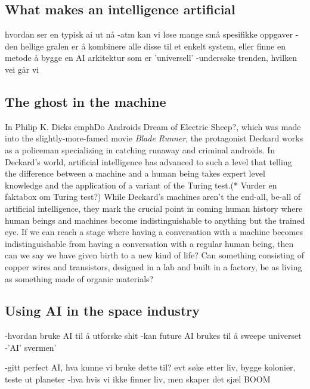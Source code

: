 \subsection{What makes an intelligence artificial}

hvordan ser en typisk ai ut nå
-atm kan vi løse mange små spesifikke oppgaver
-den hellige gralen er å kombinere alle disse til et enkelt system, eller finne en metode å bygge en AI arkitektur som er 'universell'
-undersøke trenden, hvilken vei går vi

\subsection{The ghost in the machine}

In Philip K. Dicks emph{Do Androids Dream of Electric Sheep?}, which was made into the slightly-more-famed movie \emph{Blade Runner}, the protagonist Deckard works as a policeman specializing in catching runaway and criminal androids. In Deckard's world, artificial intelligence has advanced to such a level that telling the difference between a machine and a human being takes expert level knowledge and the application of a variant of the Turing test.(* Vurder en faktabox om Turing test?) 
While Deckard's machines aren't the end-all, be-all of artificial intelligence, they mark the crucial point in coming human history where human beings and machines become indistinguishable to anything but the trained eye. If we can reach a stage where having a conversation with a machine becomes indistinguishable from having a conversation with a regular human being, then can we say we have given birth to a new kind of life? Can something consisting of copper wires and transistors, designed in a lab and built in a factory, be as living as something made of organic materials? 

\subsection{Using AI in the space industry}

-hvordan bruke AI til å utforske shit
-kan future AI brukes til å sweepe universet
-'AI' svermen'


-gitt perfect AI, hva kunne vi bruke dette til? evt søke etter liv, bygge kolonier, teste ut planeter
-hva hvis vi ikke finner liv, men skaper det sjæl BOOM